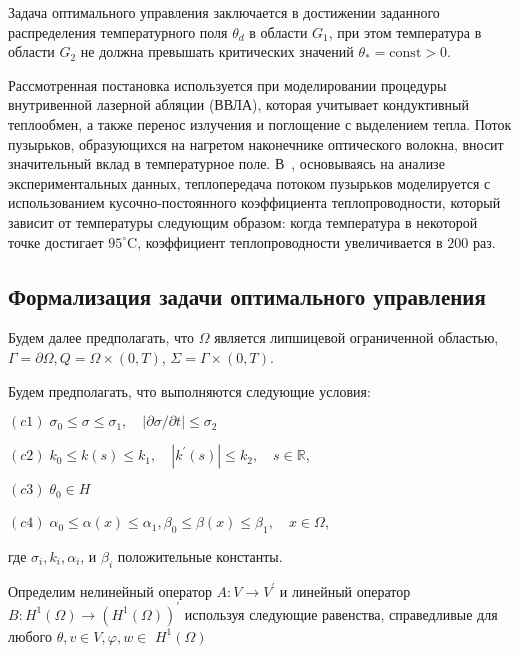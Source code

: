 \begin{remark}
    Задача оптимального управления заключается в достижении заданного распределения
    температурного поля $\theta_{d}$ в области $G_{1}$, при этом температура в области
    $G_{2}$ не должна превышать критических значений $\theta_{*}=\text{const}>0$.
\end{remark}

Рассмотренная постановка используется при
моделировании процедуры внутривенной лазерной абляции (ВВЛА),
которая учитывает кондуктивный теплообмен,
а также перенос излучения и поглощение с выделением тепла.
Поток пузырьков, образующихся на нагретом наконечнике оптического волокна,
вносит значительный вклад в температурное поле.
В~\cite{van2014optical, Some_Poluektova2014, Endovenous_Malskat2014},
основываясь на анализе экспериментальных данных,
теплопередача потоком пузырьков моделируется с использованием кусочно-постоянного
коэффициента теплопроводности, который зависит от температуры следующим образом:
когда температура в некоторой точке достигает $95 ^ {\circ} \mathrm{C}$,
коэффициент теплопроводности увеличивается в $200$ раз.

\subsection{Формализация задачи оптимального управления}
\label{subsec:ch3:sec2:subsec2}

Будем далее предполагать, что $\Omega$ является липшицевой ограниченной областью,
$\Gamma=\partial \Omega, Q=\Omega \times(0, T)$, $\Sigma=\Gamma \times(0, T)$.

Будем предполагать, что выполняются следующие условия:

$(c1)\; \sigma_{0} \leq \sigma \leq \sigma_{1},
\quad|\partial \sigma / \partial t| \leq \sigma_{2}$

$(c2)\; k_{0} \leq k(s) \leq k_{1}, \quad\left|k^{\prime}(s)\right| \leq k_{2},
\quad s \in \mathbb{R}$,

$(c3)\; \theta_{0} \in H$

$(c4)\; \alpha_{0} \leq \alpha(x) \leq \alpha_{1},
\beta_{0} \leq \beta(x) \leq \beta_{1}, \quad x \in \Omega$,

где $\sigma_{i}, k_{i}, \alpha_{i}$, и $\beta_{i}$ положительные константы.

Определим нелинейный оператор $A: V \rightarrow V^{\prime}$ и линейный оператор
$B: H^{1}(\Omega) \rightarrow\left(H^{1}(\Omega)\right)^{\prime}$
используя следующие равенства, справедливые для любого
$\theta, v \in V, \varphi, w \in$ $H^{1}(\Omega)$

